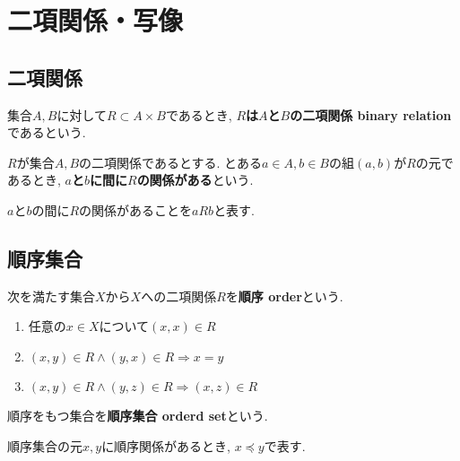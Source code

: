 \section{二項関係・写像}
\subsection{二項関係}
\begin{Def}
集合$A,B$に対して$R\subset A\times B$であるとき, {\bf $R$は$A$と$B$の二項関係 binary relation}であるという.
\end{Def}
\begin{Def}
$R$が集合$A,B$の二項関係であるとする. 
とある$a\in A, b\in B$の組$(a,b)$が$R$の元であるとき,
{\bf $a$と$b$に間に$R$の関係がある}という.
\end{Def}
\begin{Notation}
$a$と$b$の間に$R$の関係があることを$aRb$と表す.
\end{Notation}
\subsection{順序集合}
\begin{Def}
次を満たす集合$X$から$X$への二項関係$R$を{\bf 順序 order}という.
\begin{enumerate}
\item 任意の$x\in X$について$(x,x)\in R$
\item $(x,y)\in R\land(y,x)\in R\Rightarrow x=y$
\item $(x,y)\in R\land (y,z)\in R
\Rightarrow (x,z)\in R$
\end{enumerate}
\end{Def}
\begin{Def}
順序をもつ集合を{\bf 順序集合 orderd set}という.
\end{Def}
\begin{Notation}
順序集合の元$x,y$に順序関係があるとき, $x\preceq y$で表す.
\end{Notation}

